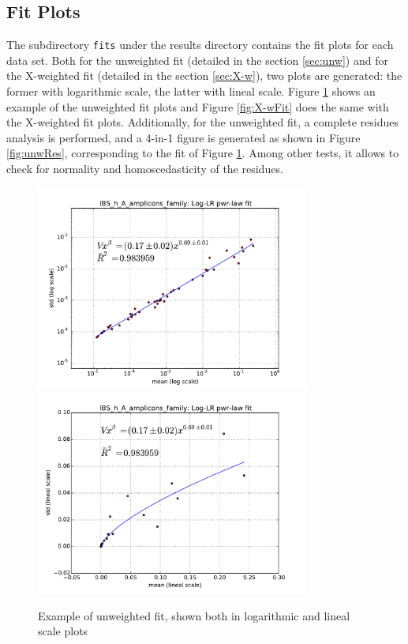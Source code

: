 \documentclass[12pt,oneside,letterpaper]{article}
\begin{document}
\subsection{Fit Plots}
The subdirectory \texttt{fits} under the results directory contains the fit plots for each data set. Both for the unweighted fit (detailed in the section \ref{sec:unw}) and for the X-weighted fit (detailed in the section \ref{sec:X-w}), two plots are generated: the former with logarithmic scale, the latter with lineal scale. Figure \ref{fig:unwFit} shows an example of the unweighted fit plots and Figure \ref{fig:X-wFit} does the same with the X-weighted fit plots. Additionally, for the unweighted fit, a complete residues analysis is performed, and a 4-in-1 figure is generated as shown in Figure \ref{fig:unwRes}, corresponding to the fit of Figure \ref{fig:unwFit}. Among other tests, it allows to check for normality and homoscedasticity of the residues.

\begin{figure}
	\centering
	\includegraphics[width=0.8\textwidth]{results/fits/IBS_h_A_amplicons_family_stdVSmean_LLR_LOG.pdf}
	\includegraphics[width=0.8\textwidth]{results/fits/IBS_h_A_amplicons_family_stdVSmean_LLR_LIN.pdf}
	\caption{Example of unweighted fit, shown both in logarithmic and lineal scale plots}
	\label{fig:unwFit}
\end{figure}
\end{document}
